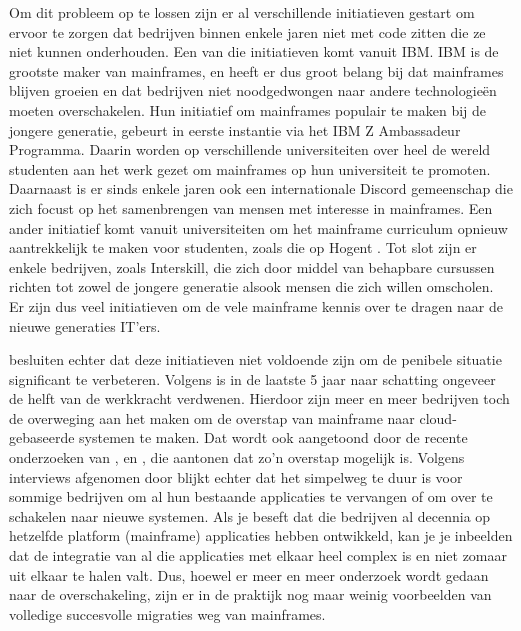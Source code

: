 Om dit probleem op te lossen zijn er al verschillende initiatieven gestart om ervoor te zorgen dat bedrijven binnen enkele jaren niet met code zitten die ze niet kunnen onderhouden. Een van die initiatieven komt vanuit IBM. IBM is de grootste maker van mainframes, en heeft er dus groot belang bij dat mainframes blijven groeien en dat bedrijven niet noodgedwongen naar andere technologieën moeten overschakelen. Hun initiatief om mainframes populair te maken bij de jongere generatie, gebeurt in eerste instantie via het IBM Z Ambassadeur Programma. Daarin worden op verschillende universiteiten over heel de wereld studenten aan het werk gezet om mainframes op hun universiteit te promoten. Daarnaast is er sinds enkele jaren ook een internationale Discord gemeenschap die zich focust op het samenbrengen van mensen met interesse in mainframes. Een ander initiatief komt vanuit universiteiten om het mainframe curriculum opnieuw aantrekkelijk te maken voor studenten, zoals die op Hogent \autocite{Blondeel2025}. Tot slot zijn er enkele bedrijven, zoals Interskill, die zich door middel van behapbare cursussen richten tot zowel de jongere generatie alsook mensen die zich willen omscholen. Er zijn dus veel initiatieven om de vele mainframe kennis over te dragen naar de nieuwe generaties IT’ers.

\textcite{Sagers2018} besluiten echter dat deze initiatieven niet voldoende zijn om de penibele situatie significant te verbeteren. Volgens \textcite{Vanaparthi2025} is in de laatste 5 jaar naar schatting ongeveer de helft van de werkkracht verdwenen. Hierdoor zijn meer en meer bedrijven toch de overweging aan het maken om de overstap van mainframe naar cloud-gebaseerde systemen te maken. Dat wordt ook aangetoond door de recente onderzoeken van \textcite{Zlatanov2016}, \textcite{Vanaparthi2025} en \textcite{Makinde2025}, die aantonen dat zo’n overstap mogelijk is. Volgens interviews afgenomen door \textcite{NgoYe2018} blijkt echter dat het simpelweg te duur is voor sommige bedrijven om al hun bestaande applicaties te vervangen of om over te schakelen naar nieuwe systemen. Als je beseft dat die bedrijven al decennia op hetzelfde platform (mainframe) applicaties hebben ontwikkeld, kan je je inbeelden dat de integratie van al die applicaties met elkaar heel complex is en niet zomaar uit elkaar te halen valt. Dus, hoewel er meer en meer onderzoek wordt gedaan naar de overschakeling, zijn er in de praktijk nog maar weinig voorbeelden van volledige succesvolle migraties weg van mainframes.


